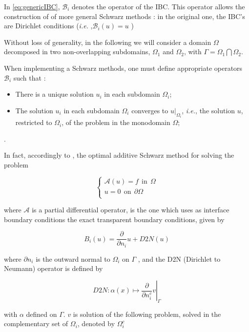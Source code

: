 \indent In \ref{eq:genericIBC}, $\mathcal{B}_i$ denotes the operator of the IBC. This operator allows the construction of of more general Schwarz methods : in the original one, the IBC's are Dirichlet conditions (\emph{i.e.} ,$\mathcal{B}_i(u) = u$  ) \cite{Japhet2003,Lions1990}

\indent Without loss of generality, in the following we will consider a domain $\Omega$ decomposed in two non-overlapping subdomains, $\Omega_1$ and $\Omega_2$, with $\Gamma = \Omega_1 \bigcap \Omega_2$.

\indent When implementing a Schwarz methods, one must define appropriate operators $\mathcal{B}_i$ such that :

\begin{itemize}
\begingroup \item There is a unique solution $u_i$ in each subdomain $\Omega_i$; \endgroup
\item The solution $u_i$ in each subdomain $\Omega_i$ converges to $u|_{\Omega_i}$, \emph{i.e.}, the solution $u$, restricted to $\Omega_i$, of the problem in the monodomain $\Omega$;
\end{itemize} 

\indent {}.

\indent In fact, accordingly to \cite{Japhet2003}, the optimal additive Schwarz method for solving the problem 

\begin{equation*}
\begin{cases}
\mathcal{A}(u) = f \ \ \text{in} \ \ \Omega\\
u = 0 \ \ \text{on} \ \ \partial\Omega\\
\end{cases}
\end{equation*}

\noindent where $\mathcal{A}$ is a partial differential operator, is the one which uses as interface boundary conditions the exact transparent boundary conditions, given by

$$B_i(u) = \frac{\partial}{\partial n_i}u + D2N(u)$$

\noindent where $\partial n_i$ is the outward normal to $\Omega_i$ on $\Gamma$ , and the D2N (Dirichlet to Neumann) operator is defined by

$$\left. D2N : \alpha(x) \mapsto \frac{\partial}{\partial n_i^c}v \right\rvert_\Gamma$$

\noindent with $\alpha$ defined on $\Gamma$. $v$ is solution of the following problem, solved in the complementary set of $\Omega_i$, denoted by $\Omega_i^c$

